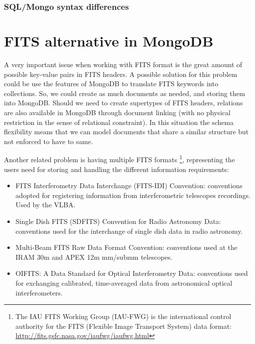 \subsubsection{SQL/Mongo syntax differences}





\section{FITS alternative in MongoDB}

A very important issue when working with FITS format is the great amount of possible key-value pairs in FITS headers. A possible solution for this problem could be use the features of MongoDB to translate FITS keywords into collections. So, we could create as much documents as needed, and storing them into MongoDB. Should we need to create supertypes of FITS headers, relations are also available in MongoDB through document linking (with no physical restriction in the sense of relational constraint). In this situation the schema flexibility means that we can model documents that share a similar structure but not enforced to have to same.

Another related problem is having multiple FITS formats \footnote{The IAU FITS Working Group (IAU-FWG) is the international control authority for the FITS (Flexible Image Transport System) data format: \url{http://fits.gsfc.nasa.gov/iaufwg/iaufwg.html}}, representing the users need for storing and handling the different information requirements:

\begin{itemize}
\item FITS Interferometry Data Interchange (FITS-IDI) Convention: conventions adopted for registering information from interferometric telescopes recordings. Used by the VLBA.
\item Single Dish FITS (SDFITS) Convention for Radio Astronomy Data: conventions used for the interchange of single dish data in radio astronomy. 
\item Multi-Beam FITS Raw Data Format Convention: conventions used at the IRAM 30m and APEX 12m mm/submm telescopes.
\item OIFITS: A Data Standard for Optical Interferometry Data: conventions used for exchanging calibrated, time-averaged data from astronomical optical interferometers.
\end{itemize}


